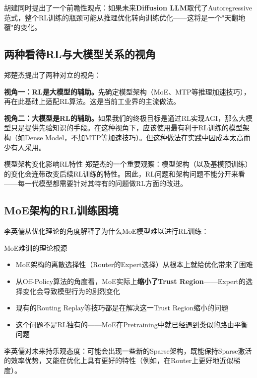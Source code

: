 \documentclass[a4paper]{article}
\begin{document}
胡建同时提出了一个前瞻性观点：如果未来\textbf{Diffusion LLM}取代了Autoregressive范式，整个RL训练的瓶颈可能从推理优化转向训练优化——这将是一个"天翻地覆"的变化。

\subsection{两种看待RL与大模型关系的视角}

郑楚杰提出了两种对立的视角：

\textbf{视角一：RL是大模型的辅助。}先确定模型架构（MoE、MTP等推理加速技巧），再在此基础上适配RL算法。这是当前工业界的主流做法。

\textbf{视角二：大模型是RL的辅助。}如果我们的终极目标是通过RL实现AGI，那么大模型只是提供先验知识的手段。在这种视角下，应该使用最有利于RL训练的模型架构（如Dense Model，不加MTP等加速技巧）。但这种做法在实践中因成本太高而少有人采用。

\begin{knowledgebox}{模型架构变化影响RL特性}
郑楚杰的一个重要观察：模型架构（以及基模预训练）的变化会连带改变后续RL训练的特性。因此，RL问题和架构问题不能分开来看——每一代模型都需要针对其特有的问题做RL方面的改进。
\end{knowledgebox}

\subsection{MoE架构的RL训练困境}

李英儒从优化理论的角度解释了为什么MoE模型难以进行RL训练：

\begin{warningbox}{MoE难训的理论根源}
\begin{itemize}
    \item MoE架构的离散选择性（Router的Expert选择）从根本上就给优化带来了困难
    \item 从Off-Policy算法的角度看，MoE实际上\textbf{缩小了Trust Region}——Expert的选择变化会导致模型行为的剧烈变化
    \item 现有的Routing Replay等技巧都是在解决这一Trust Region缩小的问题
    \item 这个问题不是RL独有的——MoE在Pretraining中就已经遇到类似的路由平衡问题
\end{itemize}
\end{warningbox}

李英儒对未来持乐观态度：可能会出现一些新的Sparse架构，既能保持Sparse激活的效率优势，又能在优化上具有更好的特性（例如，在Router上更好地近似梯度）。
\end{document}
